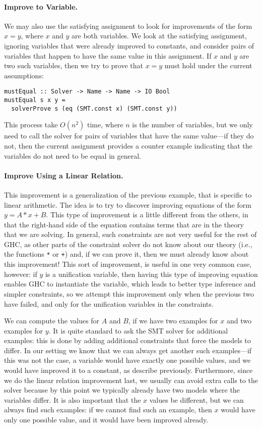 \documentclass{sigplanconf}
\begin{document}
\paragraph{Improve to Variable.}
We may also use the satisfying assignment to look for improvements of
the form $x = y$, where $x$ and $y$ are both variables.
We look at the satisfying assignment, ignoring variables
that were already improved to constants, and consider pairs of variables
that happen to have the same value in this assignment. If $x$ and $y$
are two such variables, then we try to prove that $x = y$ must hold
under the current assumptions:
\begin{Verbatim}
mustEqual :: Solver -> Name -> Name -> IO Bool
mustEqual s x y =
  solverProve s (eq (SMT.const x) (SMT.const y))
\end{Verbatim}
This process take $O(n^2)$ time, where $n$ is the number of variables,
but we only need to call the solver for pairs of variables that have the same
value---if they do not, then the current assignment provides a counter
example indicating that the variables do not need to be equal in general.

\paragraph{Improve Using a Linear Relation.}
This improvement is a generalization of the previous example, that
is specific to linear arithmetic.  The idea is to try to discover
improving equations of the form $y = A * x + B$.  This type of
improvement is a little different from the others, in that the right-hand
side of the equation contains terms that are in the theory that we are solving.
In general, such constraints are not very useful for the rest of GHC,
as other parts of the constraint solver do not know about our theory
(i.e., the functions \Verb"*" or \Verb"+") and, if we can prove it, then
we must already know about this improvement!  This sort of improvement, is
useful in one very common case, however:  if $y$ is a unification variable,
then having this type of improving equation enables GHC to instantiate
the variable, which leads to better type inference and simpler constraints,
so we attempt this improvement only when the previous two have failed,
and only for the unification variables in the constraints.

We can compute the values for $A$ and $B$, if we have two examples for
$x$ and two examples for $y$.  It is quite standard to ask the SMT
solver for additional examples: this is done by adding additional constraints
that force the models to differ.  In our setting we know that we can
always get another such examples---if this was not the case, a variable
would have exactly one possible values, and we would have improved
it to a constant, as describe previously.  Furthermore, since we do the linear
relation improvement last, we usually can avoid extra calls to the solver
because by this point we typically already have two models where
the variables differ.  It is also
important that the $x$ values be different, but we can always find such
examples: if we cannot find such an example, then $x$ would have only
one possible value, and it would have been improved already.
\end{document}
